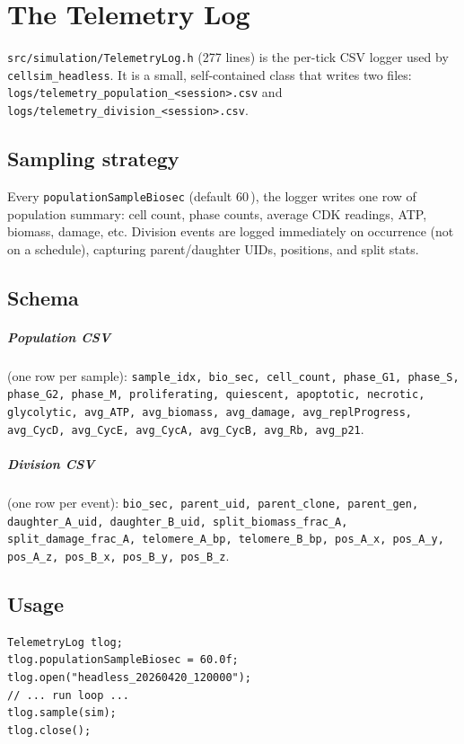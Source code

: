 \documentclass[11pt,letterpaper,twoside,openany]{book}
\newcommand{\code}[1]{\texttt{#1}}
\newcommand{\file}[1]{\texttt{\small#1}}
\newcommand{\biosec}{\text{bio-s}}
\begin{document}
\chapter{The Telemetry Log}
\label{ch:telemetry}

\file{src/simulation/TelemetryLog.h} (277 lines) is the per-tick
CSV logger used by \code{cellsim\_headless}. It is a small,
self-contained class that writes two files:
\file{logs/telemetry\_population\_<session>.csv} and
\file{logs/telemetry\_division\_<session>.csv}.

\section{Sampling strategy}

Every \code{populationSampleBiosec} (default 60\,\biosec), the
logger writes one row of population summary: cell count, phase
counts, average CDK readings, ATP, biomass, damage, etc.
Division events are logged immediately on occurrence (not on a
schedule), capturing parent/daughter UIDs, positions, and split
stats.

\section{Schema}

\paragraph{Population CSV} (one row per sample):
\code{sample\_idx, bio\_sec, cell\_count, phase\_G1, phase\_S,
phase\_G2, phase\_M, proliferating, quiescent, apoptotic, necrotic,
glycolytic, avg\_ATP, avg\_biomass, avg\_damage,
avg\_replProgress, avg\_CycD, avg\_CycE, avg\_CycA, avg\_CycB,
avg\_Rb, avg\_p21}.

\paragraph{Division CSV} (one row per event):
\code{bio\_sec, parent\_uid, parent\_clone, parent\_gen,
daughter\_A\_uid, daughter\_B\_uid, split\_biomass\_frac\_A,
split\_damage\_frac\_A, telomere\_A\_bp, telomere\_B\_bp,
pos\_A\_x, pos\_A\_y, pos\_A\_z, pos\_B\_x, pos\_B\_y, pos\_B\_z}.

\section{Usage}

\begin{lstlisting}
TelemetryLog tlog;
tlog.populationSampleBiosec = 60.0f;
tlog.open("headless_20260420_120000");
// ... run loop ...
tlog.sample(sim);
tlog.close();
\end{lstlisting}
\end{document}
